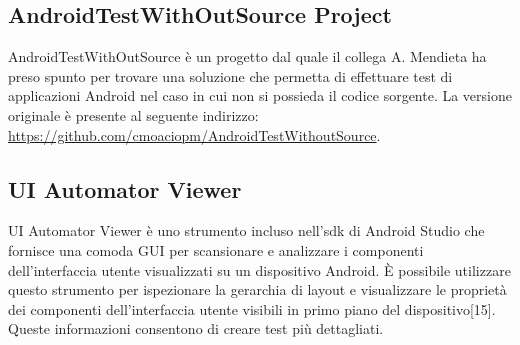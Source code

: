 \subsection*{AndroidTestWithOutSource Project}
AndroidTestWithOutSource  è un progetto dal quale il collega A. Mendieta ha preso spunto per trovare una soluzione che permetta di effettuare test di applicazioni Android nel caso in cui non si possieda il codice sorgente. La versione originale è presente al seguente indirizzo: \newline
\url{https://github.com/cmoaciopm/AndroidTestWithoutSource}.

\subsection*{UI Automator Viewer}
UI Automator Viewer è uno strumento incluso nell'sdk di Android Studio che fornisce una comoda GUI per scansionare e analizzare i componenti dell'interfaccia utente visualizzati su un dispositivo Android. È possibile utilizzare questo strumento per ispezionare la gerarchia di layout e visualizzare le proprietà dei componenti dell'interfaccia utente visibili in primo piano del dispositivo[15]. Queste informazioni consentono di creare test più dettagliati.